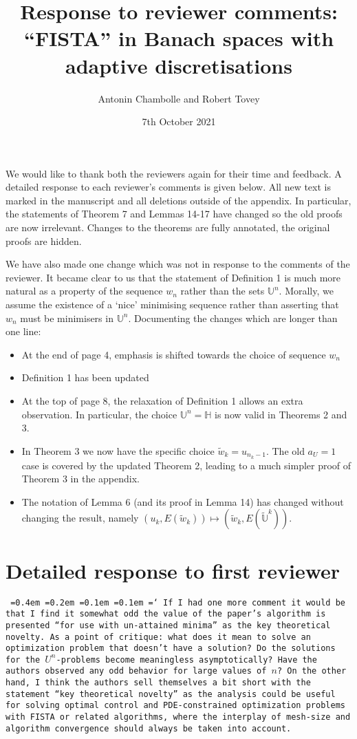 \documentclass[12pt]{article}
\title{Response to reviewer comments:\\``FISTA'' in Banach spaces with adaptive discretisations}
\author{Antonin Chambolle and Robert Tovey}
\date{7th October 2021}
\newcommand*\justify{%
	\fontdimen2\font=0.4em%
	\fontdimen3\font=0.2em%
	\fontdimen4\font=0.1em%
	\fontdimen7\font=0.1em%
	\hyphenchar\font=`\-%
}
\newcommand{\review}[1]{\texttt{\justify{#1}}}
\newcommand{\F}[1]{\mathbb{#1}}
\begin{document}
\maketitle

We would like to thank both the reviewers again for their time and feedback. A detailed response to each reviewer's comments is given below. All new text is marked in the manuscript and all deletions outside of the appendix. In particular, the statements of Theorem 7 and Lemmas 14-17 have changed so the old proofs are now irrelevant. Changes to the theorems are fully annotated, the original proofs are hidden.

We have also made one change which was not in response to the comments of the reviewer. It became clear to us that the statement of Definition 1 is much more natural as a property of the sequence $w_n$ rather than the sets $\F{U}^n$. Morally, we assume the existence of a `nice' minimising sequence rather than asserting that $w_n$ must be minimisers in $\F{U}^n$. Documenting the changes which are longer than one line:
\begin{itemize}
	\item At the end of page 4, emphasis is shifted towards the choice of sequence $w_n$
	\item Definition 1 has been updated
	\item At the top of page 8, the relaxation of Definition 1 allows an extra observation. In particular, the choice $\F{U}^n=\F H$ is now valid in Theorems 2 and 3.
	\item In Theorem 3 we now have the specific choice $\tilde{w}_k = u_{n_k-1}$. The old $a_U=1$ case is covered by the updated Theorem 2, leading to a much simpler proof of Theorem 3 in the appendix.
	\item The notation of Lemma 6 (and its proof in Lemma 14) has changed without changing the result, namely $(u_k,E(\tilde{w}_k))\mapsto (\tilde{w}_k, E(\tilde{\F{U}}^k))$.
\end{itemize}


\section{Detailed response to first reviewer}
\review{If I had one more comment it would be that I find it somewhat odd the value of the paper's algorithm is presented ``for use with un-attained minima'' as the key theoretical novelty. As a point of critique: what does it mean to solve an optimization problem that doesn't have a solution? Do the solutions for the $U^n$-problems become meaningless asymptotically? Have the authors observed any odd behavior for large values of $n$? On the other hand, I think the authors sell themselves a bit short with the statement ``key theoretical novelty'' as the analysis could be useful for solving optimal control and PDE-constrained optimization problems with FISTA or related algorithms, where the interplay of mesh-size and algorithm convergence should always be taken into account.}
\end{document}
